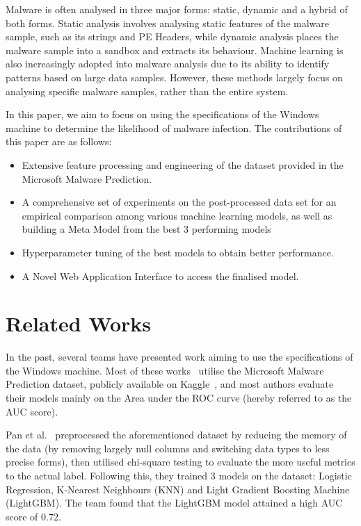\documentclass[pdflatex,sn-basic,Numbered]{sn-jnl}%
\theoremstyle{thmstyleone}%
\theoremstyle{thmstyletwo}%
\theoremstyle{thmstylethree}%
\begin{document}
Malware is often analysed in three major forms: static, dynamic and a hybrid of both forms.
Static analysis involves analysing static features of the malware sample, such as its strings and PE Headers, while dynamic analysis places the malware sample into a sandbox and extracts its behaviour.
Machine learning is also increasingly adopted into malware analysis due to its ability to identify patterns based on large data samples.
However, these methods largely focus on analysing specific malware samples, rather than the entire system.


In this paper, we aim to focus on using the specifications of the Windows machine to determine the likelihood of malware infection.
The contributions of this paper are as follows:
\begin{itemize}
\item  Extensive feature processing and engineering of the dataset provided in the Microsoft Malware Prediction.
\item A comprehensive set of experiments on the post-processed data set for an empirical comparison among various machine learning models, as well as building a Meta Model from the best 3 performing models
\item Hyperparameter tuning of the best models to obtain better performance.
\item A Novel Web Application Interface to access the finalised model.
\end{itemize}

\section{Related Works}\label{sec:related-works}

In the past, several teams have presented work aiming to use the specifications of the Windows machine.
Most of these works~\cite{iop2020,shahini2019,sokolov2021} utilise the Microsoft Malware Prediction dataset, publicly available on Kaggle~\cite{microsoft-malware-prediction}, and most authors evaluate their models mainly on the Area under the ROC curve (hereby referred to as the AUC score).

Pan et al.~\cite{iop2020} preprocessed the aforementioned dataset by reducing the memory of the data (by removing largely null columns and switching data types to less precise forms), then utilised chi-square testing to evaluate the more useful metrics to the actual label.
Following this, they trained 3 models on the dataset: Logistic Regression, K-Nearest Neighbours (KNN) and Light Gradient Boosting Machine (LightGBM). The team found that the LightGBM model attained a high AUC score of 0.72.
\end{document}
